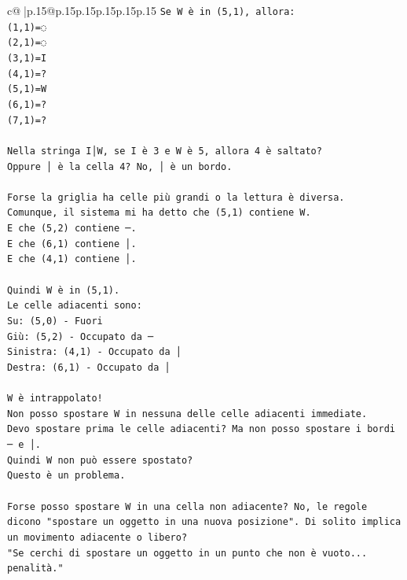 \documentclass{article}
\begin{document}
{\begin{supertabular}{c@{$\;$}|p{.15\linewidth}@{}p{.15\linewidth}p{.15\linewidth}p{.15\linewidth}p{.15\linewidth}p{.15\linewidth}}
{{{\texttt{Se W è in (5,1), allora:} \\
\texttt{(1,1)=◌} \\
\texttt{(2,1)=◌} \\
\texttt{(3,1)=I} \\
\texttt{(4,1)=?} \\
\texttt{(5,1)=W} \\
\texttt{(6,1)=?} \\
\texttt{(7,1)=?} \\
\\ 
\texttt{Nella stringa I│W, se I è 3 e W è 5, allora 4 è saltato?} \\
\texttt{Oppure │ è la cella 4? No, │ è un bordo.} \\
\\ 
\texttt{Forse la griglia ha celle più grandi o la lettura è diversa.} \\
\texttt{Comunque, il sistema mi ha detto che (5,1) contiene W.} \\
\texttt{E che (5,2) contiene ─.} \\
\texttt{E che (6,1) contiene │.} \\
\texttt{E che (4,1) contiene │.} \\
\\ 
\texttt{Quindi W è in (5,1).} \\
\texttt{Le celle adiacenti sono:} \\
\texttt{Su: (5,0) {-} Fuori} \\
\texttt{Giù: (5,2) {-} Occupato da ─} \\
\texttt{Sinistra: (4,1) {-} Occupato da │} \\
\texttt{Destra: (6,1) {-} Occupato da │} \\
\\ 
\texttt{W è intrappolato!} \\
\texttt{Non posso spostare W in nessuna delle celle adiacenti immediate.} \\
\texttt{Devo spostare prima le celle adiacenti? Ma non posso spostare i bordi ─ e │.} \\
\texttt{Quindi W non può essere spostato?} \\
\texttt{Questo è un problema.} \\
\\ 
\texttt{Forse posso spostare W in una cella non adiacente? No, le regole dicono "spostare un oggetto in una nuova posizione". Di solito implica un movimento adiacente o libero?} \\
\texttt{"Se cerchi di spostare un oggetto in un punto che non è vuoto... penalità."} \\
}}}
\end{supertabular}}
\end{document}
